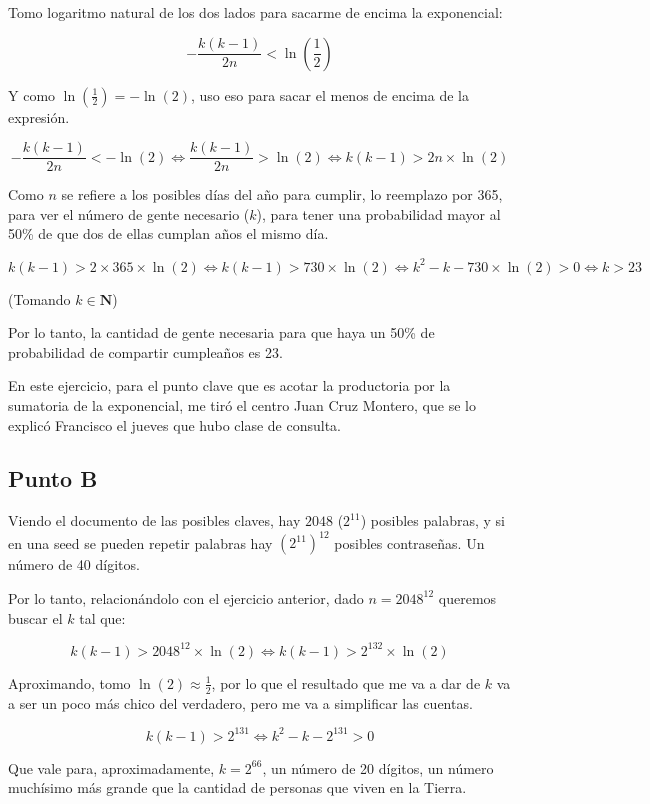 \documentclass[12pt]{article}
\begin{document}
Tomo logaritmo natural de los dos lados para sacarme de encima la exponencial:

\[
-\frac{k(k-1)}{2n} < \ln\left(\frac{1}{2}\right)
\]

Y como $\ln\left(\frac{1}{2}\right) = -\ln(2)$, uso eso para sacar el menos de encima de la expresión.

\[
-\frac{k(k-1)}{2n} < -\ln(2) \iff \frac{k(k-1)}{2n} > \ln(2) \iff k(k-1) > 2n \times \ln(2)
\]

Como $n$ se refiere a los posibles días del año para cumplir, lo reemplazo por 365, para ver el número de gente necesario ($k$), para tener una probabilidad mayor al 50\% de que dos de ellas cumplan años el mismo día.

\[
k(k-1) > 2 \times 365 \times \ln(2) \iff k(k-1) > 730 \times \ln(2) \iff k^2 - k - 730 \times \ln(2) > 0 \iff k > 23
\]

(Tomando $k \in \mathbf{N}$)

Por lo tanto, la cantidad de gente necesaria para que haya un 50\% de probabilidad de compartir cumpleaños es 23.

En este ejercicio, para el punto clave que es acotar la productoria por la sumatoria de la exponencial, me tiró el centro Juan Cruz Montero, que se lo explicó Francisco el jueves que hubo clase de consulta.

\subsection*{Punto B}

Viendo el documento de las posibles claves, hay $2048$ ($2^{11}$) posibles palabras, y si en una seed se pueden repetir palabras hay $(2^{11})^{12}$ posibles contraseñas. Un número de 40 dígitos.

Por lo tanto, relacionándolo con el ejercicio anterior, dado $n = 2048^{12}$ queremos buscar el $k$ tal que: 

\[
k(k-1) > 2048^{12} \times \ln(2) \iff k(k-1) > 2^{132} \times \ln(2)
\]

Aproximando, tomo $\ln(2) \approx \frac{1}{2}$, por lo que el resultado que me va a dar de $k$ va a ser un poco más chico del verdadero, pero me va a simplificar las cuentas.

\[
k(k-1) > 2^{131} \iff k^2 - k - 2^{131} > 0
\]

Que vale para, aproximadamente, $k = 2^{66}$, un número de 20 dígitos, un número muchísimo más grande que la cantidad de personas que viven en la Tierra.
\end{document}
